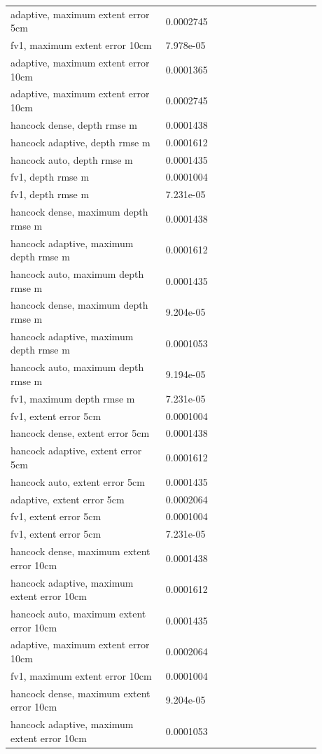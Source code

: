 \begin{longtable}{p{0.4400\linewidth}p{0.4400\linewidth}}
adaptive, maximum extent error 5cm & 0.0002745 \\
fv1, maximum extent error 10cm & 7.978e-05 \\
adaptive, maximum extent error 10cm & 0.0001365 \\
adaptive, maximum extent error 10cm & 0.0002745 \\
hancock dense, depth rmse m & 0.0001438 \\
hancock adaptive, depth rmse m & 0.0001612 \\
hancock auto, depth rmse m & 0.0001435 \\
fv1, depth rmse m & 0.0001004 \\
fv1, depth rmse m & 7.231e-05 \\
hancock dense, maximum depth rmse m & 0.0001438 \\
hancock adaptive, maximum depth rmse m & 0.0001612 \\
hancock auto, maximum depth rmse m & 0.0001435 \\
hancock dense, maximum depth rmse m & 9.204e-05 \\
hancock adaptive, maximum depth rmse m & 0.0001053 \\
hancock auto, maximum depth rmse m & 9.194e-05 \\
fv1, maximum depth rmse m & 7.231e-05 \\
fv1, extent error 5cm & 0.0001004 \\
hancock dense, extent error 5cm & 0.0001438 \\
hancock adaptive, extent error 5cm & 0.0001612 \\
hancock auto, extent error 5cm & 0.0001435 \\
adaptive, extent error 5cm & 0.0002064 \\
fv1, extent error 5cm & 0.0001004 \\
fv1, extent error 5cm & 7.231e-05 \\
hancock dense, maximum extent error 10cm & 0.0001438 \\
hancock adaptive, maximum extent error 10cm & 0.0001612 \\
hancock auto, maximum extent error 10cm & 0.0001435 \\
adaptive, maximum extent error 10cm & 0.0002064 \\
fv1, maximum extent error 10cm & 0.0001004 \\
hancock dense, maximum extent error 10cm & 9.204e-05 \\
hancock adaptive, maximum extent error 10cm & 0.0001053 \\

\end{longtable}
